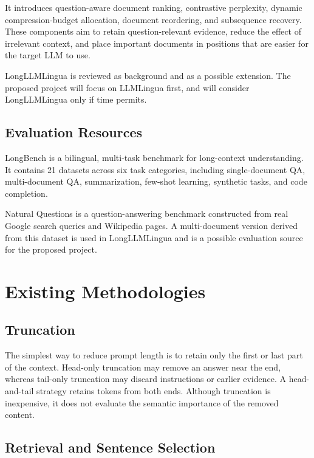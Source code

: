 \documentclass[10pt,a4paper,twocolumn]{article}
\begin{document}
It introduces question-aware document ranking, contrastive perplexity, dynamic compression-budget allocation, document reordering, and subsequence recovery. These components aim to retain question-relevant evidence, reduce the effect of irrelevant context, and place important documents in positions that are easier for the target LLM to use.

LongLLMLingua is reviewed as background and as a possible extension. The proposed project will focus on LLMLingua first, and will consider LongLLMLingua only if time permits.

\subsection{Evaluation Resources}

LongBench \citep{bai-etal-2024-longbench} is a bilingual, multi-task benchmark for long-context understanding. It contains 21 datasets across six task categories, including single-document QA, multi-document QA, summarization, few-shot learning, synthetic tasks, and code completion.

Natural Questions \citep{kwiatkowski-etal-2019-natural} is a question-answering benchmark constructed from real Google search queries and Wikipedia pages. A multi-document version derived from this dataset is used in LongLLMLingua and is a possible evaluation source for the proposed project.

\section{Existing Methodologies}

\subsection{Truncation}

The simplest way to reduce prompt length is to retain only the first or last part of the context. Head-only truncation may remove an answer near the end, whereas tail-only truncation may discard instructions or earlier evidence. A head-and-tail strategy retains tokens from both ends. Although truncation is inexpensive, it does not evaluate the semantic importance of the removed content.

\subsection{Retrieval and Sentence Selection}
\end{document}
